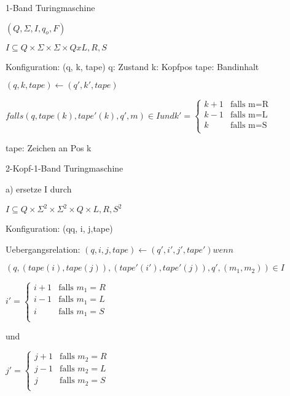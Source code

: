 \documentclass[12pt, oneside, a4paper, numbers=enddot, abstracton, parskip=full]{scrreprt}
\begin{document}
1-Band Turingmaschine

$(Q, \Sigma,I, q_o, F)$

$I \subseteq Q \times\Sigma\times\Sigma\times Q x{L,R,S}$

Konfiguration: (q, k, tape)
q: Zustand
k: Kopfpos
tape: Bandinhalt

$(q,k,tape) \leftarrow (q',k', tape)$                  
                                                     
\begin{math}
falls (q, tape(k), tape'(k), q', m) \in I und k' =
  \begin{cases}
  k+1 & \text{falls m=R} \\
  k-1 & \text{falls m=L} \\
  k   & \text{falls m=S}\\
\end{cases}
\end{math}
                                                     

tape: Zeichen an Pos k

                                               
2-Kopf-1-Band Turingmaschine


a) ersetze I durch

$I \subseteq Q \times\Sigma ^2\times\Sigma ^2\times Q \times{L,R,S}^2$

Konfiguration: (qq, i, j,tape)

Uebergangsrelation:
$(q,i,j,tape) \leftarrow (q',i',j',tape') wenn$

$(q,(tape(i),tape(j)), (tape'(i'),tape'(j)),q',(m_1,m_2)) \in I $

\begin{math}
  i' =
  \begin{cases}
    i+1 & \text{falls } m_1 = R \\
    i-1 & \text{falls } m_1 = L \\
    i   & \text{falls } m_1 = S \\
  \end{cases}  
\end{math}

und

\begin{math}
  j' =
  \begin{cases}
    j+1 & \text{falls } m_2 = R \\
    j-1 & \text{falls } m_2 = L \\
    j   & \text{falls } m_2 = S \\
  \end{cases}
\end{math}
\end{document}
